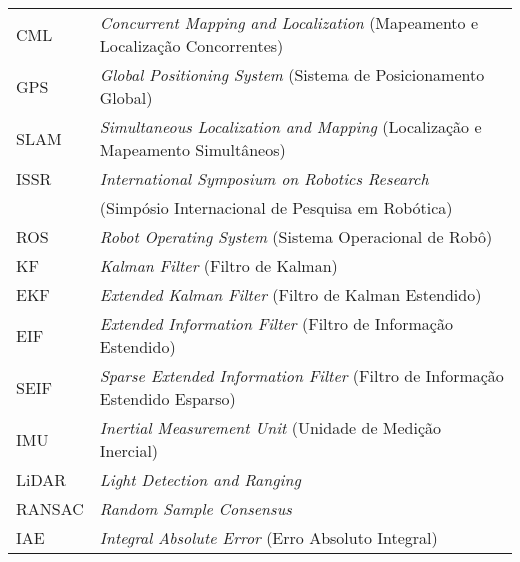 \begin{longtable}{ll}
CML & \textit{Concurrent Mapping and Localization} (Mapeamento e Localização Concorrentes)\\
GPS & \textit{Global Positioning System} (Sistema de Posicionamento Global)\\
SLAM & \textit{Simultaneous Localization and Mapping} (Localização e Mapeamento Simultâneos) \\
ISSR & \textit{International Symposium on Robotics Research}\\
& (Simpósio Internacional de Pesquisa em Robótica)\\
ROS & \textit{Robot Operating System} (Sistema Operacional de Robô)\\
KF & \textit{Kalman Filter} (Filtro de Kalman)\\
EKF & \textit{Extended Kalman Filter} (Filtro de Kalman Estendido)\\
EIF & \textit{Extended Information Filter} (Filtro de Informação Estendido)\\
SEIF & \textit{Sparse Extended Information Filter} (Filtro de Informação Estendido Esparso)\\
IMU & \textit{Inertial Measurement Unit} (Unidade de Medição Inercial)\\
LiDAR & \textit{Light Detection and Ranging} \\
RANSAC & \textit{Random Sample Consensus} \\
IAE & \textit{Integral Absolute Error} (Erro Absoluto Integral)
\end{longtable}

